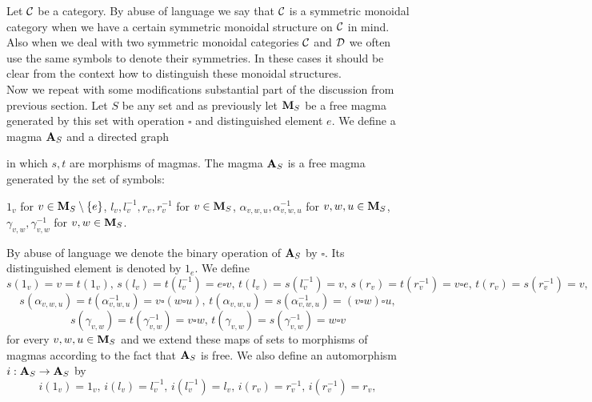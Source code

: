 \noindent
Let ${\mathcal C}$ be a category. By abuse of language we say that ${\mathcal C}$ is a symmetric monoidal category when we have a certain symmetric monoidal structure on ${\mathcal C}$ in mind. Also when we deal with two symmetric monoidal categories ${\mathcal C}$ and ${\mathcal D}$ we often use the same symbols to denote their symmetries. In these cases it should be clear from the context how to distinguish these monoidal structures.\\
Now we repeat with some modifications substantial part of the discussion from previous section. Let $S$ be any set and as previously let $\mathbf{M}_S$ be a free magma generated by this set with operation $\square$ and distinguished element $e$. We define a magma $\mathbf{A}_S$ and a directed graph
\begin{center}
\end{center}
in which $s, t$ are morphisms of magmas. The magma $\mathbf{A}_S$ is a free magma generated by the set of symbols:
\begin{center}
$1_v$ for $v\in \mathbf{M}_S\setminus \{e\}$, $l_v,l^{-1}_v,r_v,r^{-1}_v$ for $v\in \mathbf{M}_S$, $\alpha_{v,w,u},\alpha^{-1}_{v,w,u}$ for $v,w,u\in \mathbf{M}_S$, $\gamma_{v,w},\gamma^{-1}_{v,w}$ for $v,w\in \mathbf{M}_S$.
\end{center}
By abuse of language we denote the binary operation of $\mathbf{A}_S$ by $\square$. Its distinguished element is denoted by $1_e$. We define
$$s(1_v) = v = t(1_v),\,s(l_v) = t(l_v^{-1}) = e\square v,\,t(l_v) = s(l^{-1}_v) = v,\,s(r_v)= t(r^{-1}_v) = v\square e,\,t(r_v)= s(r^{-1}_v) = v,$$
$$s(\alpha_{v,w,u})= t(\alpha^{-1}_{v,w,u})=v\square(w\square u),\,t(\alpha_{v,w,u})= s(\alpha^{-1}_{v,w,u})=(v\square w)\square u,$$
$$s(\gamma_{v,w})=t(\gamma^{-1}_{v,w}) = v\square w,\,t(\gamma_{v,w}) = s(\gamma^{-1}_{v,w}) = w\square v$$
for every $v,w,u\in \mathbf{M}_S$ and we extend these maps of sets to morphisms of magmas according to the fact that $\mathbf{A}_S$ is free. We also define an automorphism $i:\mathbf{A}_S\rightarrow \mathbf{A}_S$ by
$$i(1_v)=1_v,\,i(l_v)=l^{-1}_v,\,i(l^{-1}_v)=l_v,\,i(r_v)=r^{-1}_v,\,i(r^{-1}_v)=r_v,$$
